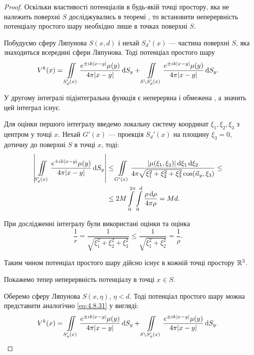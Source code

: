 \begin{proof}
	Оскільки властивості потенціалів в будь-якій точці простору, яка не належить поверхні $S$ досліджувались в теоремі , то встановити неперервність потенціалу простого шару необхідно лише в точках поверхні  $S$. \medskip

	Побудуємо сферу Ляпунова $S(x, d)$ і нехай $S_d'(x)$ --- частина поверхні $S$, яка знаходиться всередині сфери Ляпунова. Тоді потенціал простого шару 
	\begin{equation}
		\label{eq:4.8.31}
		V^k(x) = \displaystyle\iint\limits_{S_d'(x)} \frac{e^{\pm i k |x - y|} \mu(y)}{4 \pi |x - y|} \mathop{}\!\mathrm{d} S_y + \displaystyle\iint\limits_{S \setminus S_d'(x)} \frac{e^{\pm i k |x - y|} \mu(y)}{4 \pi |x - y|} \mathop{}\!\mathrm{d} S_y.
	\end{equation}

	У другому інтегралі підінтегральна функція є неперервна і обмежена , а значить цей інтеграл існує. \medskip

	Для оцінки першого інтегралу введемо локальну систему координат $\xi_1, \xi_2, \xi_3$ з центром у точці $x$. Нехай $G'(x)$ --- проекція $S_d'(x)$ на площину $\xi_3 = 0$, дотичну до поверхні $S$ в точці $x$, тоді:
	\begin{equation}
		\begin{aligned}
			\left| \displaystyle\iint\limits_{S_d'(x)} \frac{e^{\pm i k |x - y|} \mu(y)}{4 \pi |x - y|} \mathop{}\!\mathrm{d} S_y \right| &\le \displaystyle\iint\limits_{G'(x)} \frac{|\mu(\xi_1, \xi_2)| \mathop{}\!\mathrm{d} \xi_1 \mathop{}\!\mathrm{d} \xi_2}{4 \pi \sqrt{\xi_1^2 + \xi_2^2 + \xi_3^2} \cos(\vec n_y, \xi_3)} \le \\
			&\le 2 M \displaystyle\int\limits_0^{2\pi} \displaystyle\int\limits_0^d \frac{\rho \mathop{}\!\mathrm{d} \rho}{4 \pi \rho} = M d.
		\end{aligned}
	\end{equation}

	При дослідженні інтегралу були використані оцінки  та оцінка
	\begin{equation}
		\frac{1}{r} = \frac{1}{\sqrt{\xi_1^2 + \xi_2^2 + \xi_3^2}} \le \frac{1}{\sqrt{\xi_1^2 + \xi_2^2}} = \frac{1}{\rho}.
	\end{equation}

	Таким чином потенціал простого шару дійсно існує в кожній точці простору $\mathbb{R}^3$. \medskip

	Покажемо тепер неперервність потенціалу в точці $x \in S$. \medskip

	Оберемо сферу Ляпунова $S(x, \eta)$, $\eta < d$. Тоді потенціал простого шару можна представити аналогічно \eqref{eq:4.8.31} у вигляді:
	\begin{equation}
		\label{eq:4.8.31'}
		V^k(x) = \displaystyle\iint\limits_{S_\eta'(x)} \frac{e^{\pm i k |x - y|} \mu(y)}{4 \pi |x - y|} \mathop{}\!\mathrm{d} S_y + \displaystyle\iint\limits_{S \setminus S_\eta'(x)} \frac{e^{\pm i k |x - y|} \mu(y)}{4 \pi |x - y|} \mathop{}\!\mathrm{d} S_y.
	\end{equation}


\end{proof}
